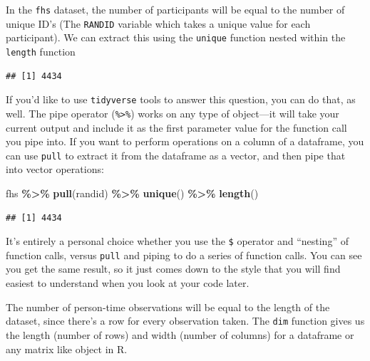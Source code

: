 \documentclass[
]{book}
\newenvironment{Shaded}{\begin{snugshade}}{\end{snugshade}}
\newcommand{\FunctionTok}[1]{\textcolor[rgb]{0.13,0.29,0.53}{\textbf{#1}}}
\newcommand{\NormalTok}[1]{#1}
\newcommand{\SpecialCharTok}[1]{\textcolor[rgb]{0.81,0.36,0.00}{\textbf{#1}}}
\begin{document}
In the \texttt{fhs} dataset, the number of participants will be equal to the number of unique ID's (The \texttt{RANDID} variable which takes a unique value for each participant). We can extract this using the \texttt{unique} function nested within the \texttt{length} function

\begin{Shaded}
\end{Shaded}

\begin{verbatim}
## [1] 4434
\end{verbatim}

If you'd like to use \texttt{tidyverse} tools to answer this question, you can do
that, as well. The pipe operator (\texttt{\%\textgreater{}\%}) works on any type of object---it will
take your current output and include it as the first parameter value for the
function call you pipe into. If you want to perform operations on a column of
a dataframe, you can use \texttt{pull} to extract it from the dataframe as a vector, and
then pipe that into vector operations:

\begin{Shaded}
\begin{Highlighting}[]
\NormalTok{fhs }\SpecialCharTok{\%\textgreater{}\%} 
  \FunctionTok{pull}\NormalTok{(randid) }\SpecialCharTok{\%\textgreater{}\%} 
  \FunctionTok{unique}\NormalTok{() }\SpecialCharTok{\%\textgreater{}\%} 
  \FunctionTok{length}\NormalTok{()}
\end{Highlighting}
\end{Shaded}

\begin{verbatim}
## [1] 4434
\end{verbatim}

It's entirely a personal choice whether you use the \texttt{\$} operator and ``nesting''
of function calls, versus \texttt{pull} and piping to do a series of function calls.
You can see you get the same result, so it just comes down to the style that
you will find easiest to understand when you look at your code later.

The number of person-time observations will be equal to the length of the dataset, since there's a row for every observation taken.
The \texttt{dim} function gives us the length (number of rows) and width (number of columns) for a dataframe or any matrix like object in R.
\end{document}

